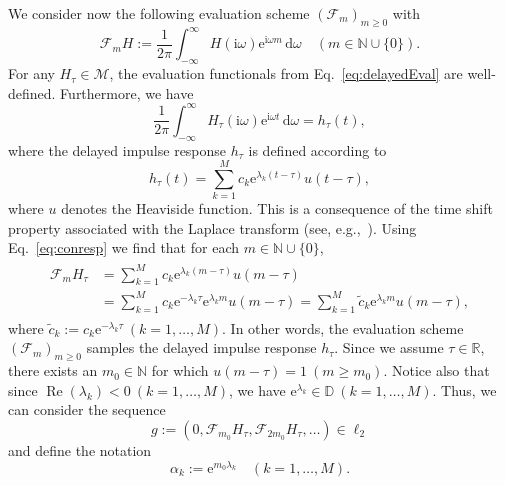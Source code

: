 \documentclass{arxiv}
\newcommand{\e}{\mathrm{e}}
\newcommand{\ri}{\mathrm{i}}
\renewcommand{\d}{\mathrm{d}}
\renewcommand{\Re}{\operatorname{Re}}
\newcommand{\cM}{\mathcal{M}}
\renewcommand{\tilde}{\widetilde}
\begin{document}
We consider now the following evaluation scheme ${(\mathcal{F}_m)}_{m \ge 0}$ with
\begin{equation}
    \label{eq:delayedEval}
    \mathcal{F}_m H := \frac{1}{2 \pi} \int_{-\infty}^{\infty} H(\ri\omega) \e^{\ri \omega m} \,\d\omega \quad (m \in \mathbb{N} \cup \{0\}).
\end{equation}
For any $H_{\tau} \in \cM$, the evaluation functionals from Eq.~\eqref{eq:delayedEval} are well-defined. Furthermore, we have
\begin{equation}
    \label{eq:conresp}
    \frac{1}{2 \pi} \int_{-\infty}^{\infty} H_{\tau}(\ri \omega) \e^{\ri \omega t} \,\d \omega = h_{\tau}(t),
\end{equation}
where the delayed impulse response $h_{\tau}$ is defined according to
\begin{equation*}
    h_{\tau}(t) = \sum_{k=1}^{M} c_k \e^{\lambda_k (t - \tau)} u(t - \tau),
\end{equation*}
where $u$ denotes the Heaviside function. This is a consequence of the time shift property associated with the Laplace transform (see, e.g.,~\cite[Eq.~(9.87)]{sigsys}). Using Eq.~\eqref{eq:conresp} we find that for each $m \in \mathbb{N} \cup \{0\}$,
\begin{align}
    \label{eq:imprespdel}
    \begin{split}
    \mathcal{F}_m H_{\tau} &= \sum_{k=1}^{M} c_k \e^{\lambda_k (m - \tau)} u(m - \tau) \\ &=  \sum_{k=1}^{M} c_k \e^{-\lambda_k \tau} \e^{\lambda_k m} u(m - \tau) = \sum_{k=1}^{M} \tilde{c}_k \e^{\lambda_k m} u(m - \tau), 
    \end{split}
\end{align}
where $\tilde{c}_k := c_k \e^{-\lambda_k \tau} \ (k=1,\ldots,M)$. In other words, the evaluation scheme ${(\mathcal{F}_m)}_{m \ge 0}$ samples the delayed impulse response $h_{\tau}$. Since we assume $\tau \in \mathbb{R}$, there exists an $m_0 \in \mathbb{N}$ for which $u(m - \tau) = 1 \ (m \geq m_0)$. Notice also that since $\Re( \lambda_k) < 0 \ (k=1,\ldots,M)$, we have $\e^{\lambda_k} \in \mathbb{D}\ (k=1,\ldots,M)$. Thus, we can consider the sequence
\begin{equation}
\label{eq:gseq}
    g := (0, \mathcal{F}_{m_0}H_{\tau}, \mathcal{F}_{2 m_0} H_{\tau}, \ldots ) \in \ell_2
\end{equation}
and define the notation
\begin{equation}
    \label{eq:discPolesDelaySys}
    \alpha_k := \e^{m_0 \lambda_k} \quad (k=1,\ldots,M).
\end{equation}
\end{document}
